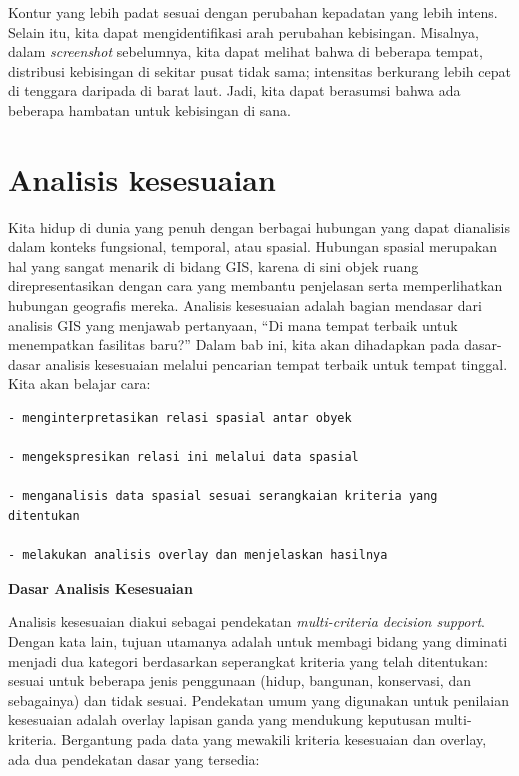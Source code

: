 \documentclass[]{book}
\begin{document}
Kontur yang lebih padat sesuai dengan perubahan kepadatan yang lebih intens. Selain itu, kita dapat mengidentifikasi arah perubahan kebisingan. Misalnya, dalam \emph{screenshot} sebelumnya, kita dapat melihat bahwa di beberapa tempat, distribusi kebisingan di sekitar pusat tidak sama; intensitas berkurang lebih cepat di tenggara daripada di barat laut. Jadi, kita dapat berasumsi bahwa ada beberapa hambatan untuk kebisingan di sana.

\hypertarget{analisis-kesesuaian}{%
\section{Analisis kesesuaian}\label{analisis-kesesuaian}}

Kita hidup di dunia yang penuh dengan berbagai hubungan yang dapat dianalisis dalam konteks fungsional, temporal, atau spasial. Hubungan spasial merupakan hal yang sangat menarik di bidang GIS, karena di sini objek ruang direpresentasikan dengan cara yang membantu penjelasan serta memperlihatkan hubungan geografis mereka. Analisis kesesuaian adalah bagian mendasar dari analisis GIS yang menjawab pertanyaan, ``Di mana tempat terbaik untuk menempatkan fasilitas baru?'' Dalam bab ini, kita akan dihadapkan pada dasar-dasar analisis kesesuaian melalui pencarian tempat terbaik untuk tempat tinggal. Kita akan belajar cara:

\begin{verbatim}
- menginterpretasikan relasi spasial antar obyek

- mengekspresikan relasi ini melalui data spasial

- menganalisis data spasial sesuai serangkaian kriteria yang ditentukan

- melakukan analisis overlay dan menjelaskan hasilnya
\end{verbatim}

\textbf{Dasar Analisis Kesesuaian}

Analisis kesesuaian diakui sebagai pendekatan \emph{multi-criteria decision support}. Dengan kata lain, tujuan utamanya adalah untuk membagi bidang yang diminati menjadi dua kategori berdasarkan seperangkat kriteria yang telah ditentukan: sesuai untuk beberapa jenis penggunaan (hidup, bangunan, konservasi, dan sebagainya) dan tidak sesuai. Pendekatan umum yang digunakan untuk penilaian kesesuaian adalah overlay lapisan ganda yang mendukung keputusan multi-kriteria. Bergantung pada data yang mewakili kriteria kesesuaian dan overlay, ada dua pendekatan dasar yang tersedia:
\end{document}
